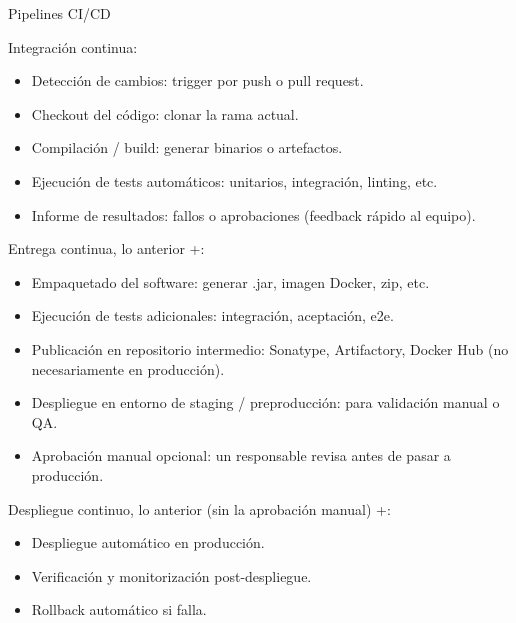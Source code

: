 \documentclass{beamer}
\begin{document}
\begin{frame}{Pipelines CI/CD}

{\scriptsize
Integración continua:

\begin{itemize}
    \item Detección de cambios: trigger por push o pull request.

\item Checkout del código: clonar la rama actual.

 \item Compilación / build: generar binarios o artefactos.

\item Ejecución de tests automáticos: unitarios, integración, linting, etc.

\item Informe de resultados: fallos o aprobaciones (feedback rápido al equipo).
\end{itemize}

\pause

Entrega continua, lo anterior +:

\begin{itemize}
    \item Empaquetado del software: generar .jar, imagen Docker, zip, etc.
    \item Ejecución de tests adicionales: integración, aceptación, e2e.

\item Publicación en repositorio intermedio: Sonatype, Artifactory, Docker Hub (no necesariamente en producción).

\item Despliegue en entorno de staging / preproducción: para validación manual o QA.

\item Aprobación manual opcional: un responsable revisa antes de pasar a producción.
\end{itemize}
\pause

Despliegue continuo, lo anterior (sin la aprobación manual) +:

\begin{itemize}
    \item Despliegue automático en producción.
    \item Verificación y monitorización post-despliegue.
    \item Rollback automático si falla.
\end{itemize}


}


    
\end{frame}
\end{document}
